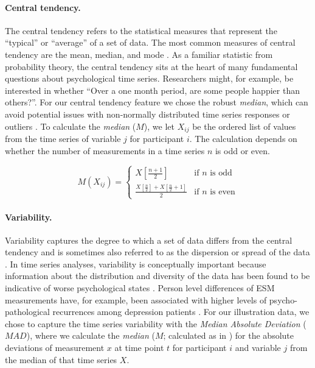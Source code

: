 \paragraph{Central tendency.}

The central tendency refers to the statistical measures that represent
the ``typical'' or ``average'' of a set of data. The most common
measures of central tendency are the mean, median, and mode
\citep{weisberg1992}. As a familiar statistic from probability theory,
the central tendency sits at the heart of many fundamental questions
about psychological time series. Researchers might, for example, be
interested in whether ``Over a one month period, are some people happier
than others?''. For our central tendency feature we chose the robust
\textit{median}, which can avoid potential issues with non-normally
distributed time series responses or outliers \citep{weisberg1992}. To
calculate the \textit{median} (\(M\)), we let \(X_{ij}\) be the ordered
list of values from the time series of variable \(j\) for participant
\(i\). The calculation depends on whether the number of measurements in
a time series \(n\) is odd or even.

\begin{equation} \label{eq:median}
  M(X_{ij}) = 
    \begin{cases}
      X \left[ \frac{n+1}{2} \right] & \text{if $n$ is odd} \\
      \frac{X \left[ \frac{n}{2} \right] + X \left[ \frac{n}{2} +1 \right]}{2} & \text{if $n$ is even}
    \end{cases}
\end{equation}

\paragraph{Variability.}

Variability captures the degree to which a set of data differs from the
central tendency and is sometimes also referred to as the dispersion or
spread of the data \citep{weisberg1992}. In time series analyses,
variability is conceptually important because information about the
distribution and diversity of the data has been found to be indicative
of worse psychological states \citep{myin-germeys2018}. Person level
differences of ESM measurements have, for example, been associated with
higher levels of psycho-pathological recurrences among depression
patients \citep{timm2017}. For our illustration data, we chose to
capture the time series variability with the
\textit{Median Absolute Deviation} (\(MAD\)), where we calculate the
\textit{median} (\(M\); calculated as in ) for the
absolute deviations of measurement \(x\) at time point \(t\) for
participant \(i\) and variable \(j\) from the median of that time series
\(X\).

